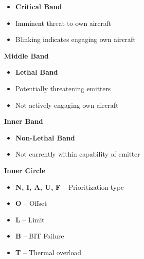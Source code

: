 \documentclass[fontSpartan]{TechCheck}
\begin{document}
\begin{tableitemize}
{\begin{subitemize}
			\begin{itemize}
				\item \textbf{Critical Band}
				\item Imminent threat to own aircraft
				\item Blinking indicates engaging own aircraft
			\end{itemize}
			\item \textbf{Middle Band}
			\begin{itemize}
				\item \textbf{Lethal Band}
				\item Potentially threatening emitters
				\item Not actively engaging own aircraft
			\end{itemize}
			\item \textbf{Inner Band}
			\begin{itemize}
				\item \textbf{Non-Lethal Band}
				\item Not currently within capability of emitter
			\end{itemize}
			\item \textbf{Inner Circle}
			\begin{itemize}
				\item \textbf{N, I, A, U, F} -- Prioritization type
				\item \textbf{O} -- Offset
				\item \textbf{L} -- Limit
				\item \textbf{B} -- BIT Failure
				\item \textbf{T} -- Thermal overload
			\end{itemize}
		\end{subitemize}}
	\end{tableitemize}

	\clearpage
\end{document}

